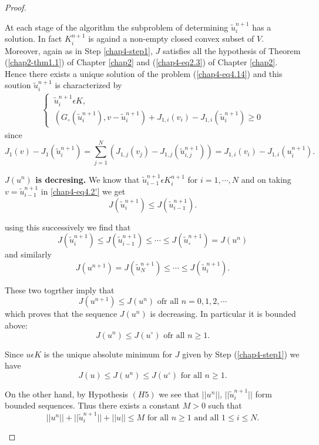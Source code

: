 \begin{proof}
\begin{step}\label{chap4-step2}
At each stage of the algorithm the subproblem of determining $\widetilde{u}_{i}^{n+1}$ has a solution. In fact $K_{i}^{n+1}$ is againd a non-empty closed convex subset of $V$. Moreover, again as in Step \ref{chap4-step1}, $J$ satisfies all the hypothesis of Theorem (\ref{chap2-thm1.1}) of Chapter \ref{chap2} and (\ref{chap4-eq2.3}) of Chapter \ref{chap2}. Hence there exists a unique solution of the problem (\ref{chap4-eq4.14}) and this soution $\widetilde{u}_{i}^{n+1}$ is characterized by
\begin{align*}
\begin{cases}
~ \widetilde{u}_{i}^{n+1} \epsilon K,\\
~ (G_{\circ} (\widetilde{u}_{i}^{n+1}), v-\widetilde{u}_{i}^{n+1}) + J_{1, i} (v_{i}) - J_{1, i} (\widetilde{u}_{i}^{n+1}) \geq 0
\end{cases}\tag{4.16}\label{chap4-eq4.16}
\end{align*}
since 
$$
J_{1} (v) - J_{1} (\widetilde{u}_{i}^{n+1}) = \sum_{j=1}^{N} (J_{1, j} (v_{j}) - J_{1,j}(\widetilde{u}_{i,j}^{n+1})) = J_{1, i} (v_{i}) - J_{1, i} (u_{i}^{n+1}).
$$\pageoriginale
\end{step}

\begin{step}\label{chap4-step3}
{\bf $J(u^{n})$ is decresing.} We know that $\widetilde{u}_{i-1}^{n+1} \epsilon K_{i}^{n+1}$ for $i = 1, \cdots, N$ and on taking $v = \widetilde{u}_{i-1}^{n+1}$ in \ref{chap4-eq4.2'} we get
$$ 
 J(\widetilde{u}_{i}^{n+1}) \leq J(\widetilde{u}_{i-1}^{n+1}).  
$$

using this successively we find that
$$
J(\widetilde{u}_{i}^{n+1}) \leq J(\widetilde{u}_{i-1}^{n+1}) \leq \cdots \leq J(\widetilde{u}_{\circ}^{n+1}) = J(u^{n})
$$
and similarly
$$
J(u^{n+1}) = J(\widetilde{u}_{N}^{n+1}) \leq \cdots \leq J(\widetilde{u}_{i}^{n+1}).
$$

These two togrther imply that
$$
J(u^{n+1}) \leq J(u^{n}) \text{ ofr all } n = 0, 1, 2, \cdots
$$
which proves that the sequence $J(u^{n})$ is decreasing. In particular it is bounded above:
$$
J(u^{n}) \leq J(u^{\circ}) \text{ ofr all } n \geq 1.
$$

Since $u \epsilon K$ is the unique absolute minimum for $J$ given by Step (\ref{chap4-step1}) we have
$$
J(u) \leq J(u^{n}) \leq J(u^{\circ}) \text{ for all } n \geq 1.
$$

On the other hand, by Hypothesis $(H5)$ we see that $||u^{n}||$, $||\widetilde{u}_{i}^{n+1}||$ form bounded sequences. Thus there exists a constant $M > 0$ such that
\begin{equation*}
|| u^{n} || + ||\widetilde{u}_{i}^{n+1} || + ||u|| \leq M \text{ for all } n \geq 1 \text{ and all } 1 \leq i \leq N.\tag{4.17}\label{chap4-eq4.17}
\end{equation*}


\end{step}
\end{proof}
